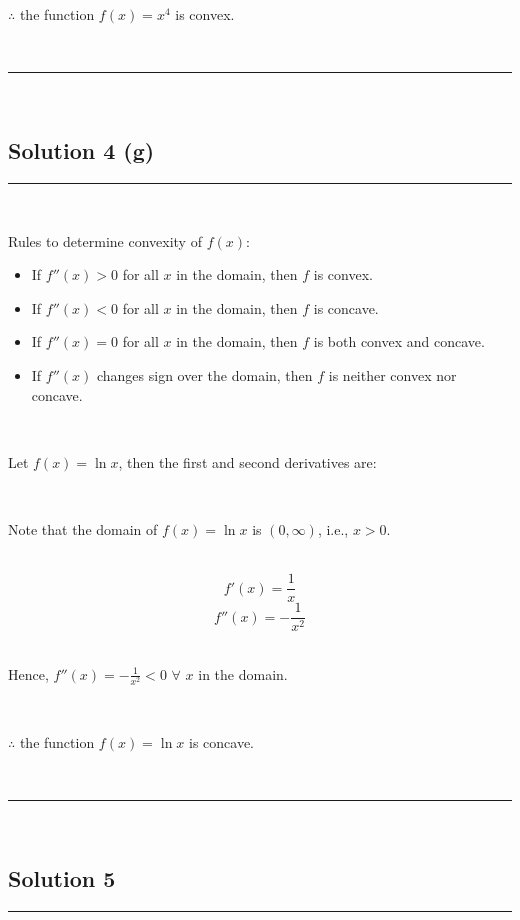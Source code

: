 \documentclass{article}
\begin{document}
\parbox{\textwidth}{
$\therefore$ the function $f(x) = x^4$ is convex.
}\\

\noindent\rule{\textwidth}{0.4pt}\\

\newpage

\subsection*{Solution 4 (g)}
\noindent\rule{\textwidth}{0.4pt}\\

\parbox{\textwidth}{
Rules to determine convexity of $f(x)$:
\begin{itemize}
    \item If $f''(x) > 0$ for all $x$ in the domain, then $f$ is convex.
    \item If $f''(x) < 0$ for all $x$ in the domain, then $f$ is concave.
    \item If $f''(x) = 0$ for all $x$ in the domain, then $f$ is both convex and concave.
    \item If $f''(x)$ changes sign over the domain, then $f$ is neither convex nor concave.
\end{itemize}
}\\

\parbox{\textwidth}{
Let $f(x) = \ln x$, then the first and second derivatives are:
}\\

\parbox{\textwidth}{
Note that the domain of $f(x) = \ln x$ is $(0, \infty)$, i.e., $x > 0$.
}\\

$$f'(x) = \frac{1}{x}$$
$$f''(x) = -\frac{1}{x^2}$$\\

\parbox{\textwidth}{
Hence, $f''(x) = -\frac{1}{x^2} < 0$ $\forall$ $x$ in the domain.
}\\

\parbox{\textwidth}{
$\therefore$ the function $f(x) = \ln x$ is concave.
}\\

\noindent\rule{\textwidth}{0.4pt}\\

\newpage

\subsection*{Solution 5}
\noindent\rule{\textwidth}{0.4pt}\\
\end{document}
